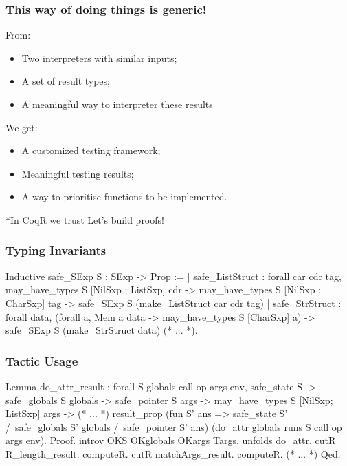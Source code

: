 \documentclass{beamer}
\begin{document}
\begin{frame}
    \frametitle{This way of doing things is generic!}

    From:
    \begin{itemize}
        \item Two interpreters with similar inputs;
        \item A set of result types;
        \item A meaningful way to interpreter these results
    \end{itemize}
    We get:
    \begin{itemize}
        \item A customized testing framework;
        \item Meaningful testing results;
        \item A way to prioritise functions to be implemented.
    \end{itemize}


\end{frame}

\sectionframe**{In CoqR we trust}{
    \vfill
    \centering{}
    \textcolor{DarkPlum}{Let’s build proofs!}
}

\begin{frame}[fragile]
    \frametitle{Typing Invariants}

\begin{coqcode}
Inductive safe_SExp S : SExp -> Prop :=
  | safe_ListStruct : forall car cdr tag,
      may_have_types S [NilSxp ; ListSxp] cdr ->
      may_have_types S [NilSxp ; CharSxp] tag ->
      safe_SExp S (make_ListStruct car cdr tag)
  | safe_StrStruct : forall data,
      (forall a, Mem a data ->
        may_have_types S [CharSxp] a) ->
      safe_SExp S (make_StrStruct data)
  (* ... *).
\end{coqcode}

\end{frame}

\begin{frame}[fragile]
    \frametitle{Tactic Usage}

\begin{coqcode}
Lemma do_attr_result :
  forall S globals call op args env,
  safe_state S ->
  safe_globals S globals ->
  safe_pointer S args ->
  may_have_types S [NilSxp; ListSxp] args ->
  (* ... *)
  result_prop (fun S' ans =>
      safe_state S' /\ safe_globals S' globals
      /\ safe_pointer S' ans)
    (do_attr globals runs S call op args env).
Proof.
  introv OKS OKglobals OKargs Targs. unfolds do_attr.
  cutR R_length_result. computeR.
  cutR matchArgs_result. computeR.
  (* ... *)
Qed.
\end{coqcode}
\end{frame}
\end{document}
